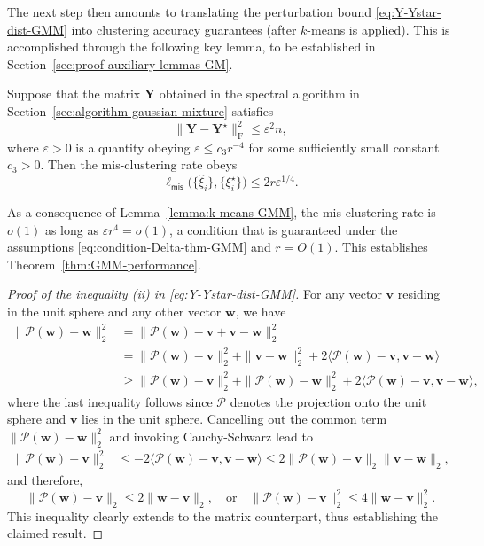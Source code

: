 

The next step then amounts to translating the perturbation bound \eqref{eq:Y-Ystar-dist-GMM} into clustering accuracy guarantees (after $k$-means is applied).
This is accomplished through the following key lemma, to be established in Section~\ref{sec:proof-auxiliary-lemmas-GM}.
%
\begin{lemma}
	\label{lemma:k-means-GMM}
	Suppose that the matrix $\bm{Y}$ obtained in the spectral algorithm in Section~\ref{sec:algorithm-gaussian-mixture} satisfies
	\begin{equation}
		\big\|\bm{Y}-\bm{Y}^{\star}\big\|_{\mathrm{F}}^{2}\leq\varepsilon^{2}n,
		\label{eq:assumption-Y-Ystar-Fro-GMM}
	\end{equation}
	where $\varepsilon>0$ is a quantity obeying $\varepsilon\leq c_{3}r^{-4}$ for some sufficiently small constant $c_3>0$.
	Then the mis-clustering rate obeys
	$$\ell_{\mathsf{mis}}\big(\{\widehat{\xi}_{i}\},\{\xi_{i}^{\star}\}\big)  \leq 2r \varepsilon^{1/4}.$$
\end{lemma}
%
As a consequence of Lemma~\ref{lemma:k-means-GMM}, the mis-clustering rate is $o(1)$ as long as $\varepsilon r^4 = o(1)$,
a condition that is guaranteed  under the assumptions \eqref{eq:condition-Delta-thm-GMM} and $r=O(1)$.
This establishes Theorem~\ref{thm:GMM-performance}.


\begin{proof}[Proof of the inequality (ii) in \eqref{eq:Y-Ystar-dist-GMM}]
For any vector $\bm{v}$ residing in the unit sphere and any other vector
$\bm{w}$, we have
%
\begin{align*}
\|\mathcal{P}(\bm{w})-\bm{w}\|_{2}^{2} & =\|\mathcal{P}(\bm{w})-\bm{v}+\bm{v}-\bm{w}\|_{2}^{2}\\
 & =\|\mathcal{P}(\bm{w})-\bm{v}\|_{2}^{2}+\|\bm{v}-\bm{w}\|_{2}^{2}+2\langle\mathcal{P}(\bm{w})-\bm{v},\bm{v}-\bm{w}\rangle\\
 & \geq\|\mathcal{P}(\bm{w})-\bm{v}\|_{2}^{2}+
 \|\mathcal{P}(\bm{w})-\bm{w}\|_{2}^{2}
 +2\langle\mathcal{P}(\bm{w})-\bm{v},\bm{v}-\bm{w}\rangle,
\end{align*}
%
where the last inequality follows since $\mathcal{P}$ denotes the projection onto the unit sphere and $\bm{v}$ lies in the unit sphere.
Cancelling out the common term $\|\mathcal{P}(\bm{w})-\bm{w}\|_{2}^{2}$ and invoking Cauchy-Schwarz lead to
%
\begin{align*}
\|\mathcal{P}(\bm{w})-\bm{v}\|_{2}^{2} & \leq-2\langle\mathcal{P}(\bm{w})-\bm{v},\bm{v}-\bm{w}\rangle\leq2\|\mathcal{P}(\bm{w})-\bm{v}\|_{2}\|\bm{v}-\bm{w}\|_{2},
\end{align*}
%
and therefore,
%
\[
\|\mathcal{P}(\bm{w})-\bm{v}\|_{2}\leq2\|\bm{w}-\bm{v}\|_{2}, 
\quad\text{or}\quad\|\mathcal{P}(\bm{w})-\bm{v}\|_{2}^{2}
\leq4\|\bm{w}-\bm{v}\|_{2}^{2}.
\]
%
This inequality clearly extends to the matrix counterpart, thus establishing the claimed result.
\end{proof}

